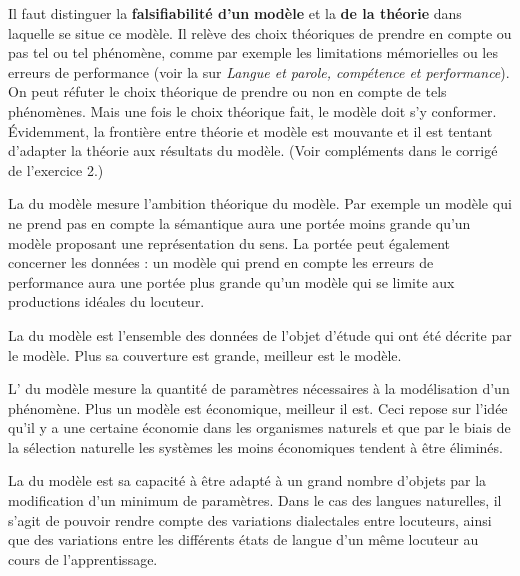 Il faut distinguer la \textbf{falsifiabilité d’un} \textbf{modèle} et la  \textbf{de la théorie} dans laquelle se situe ce modèle. Il relève des choix théoriques de prendre en compte ou pas tel ou tel phénomène, comme par exemple les limitations mémorielles ou les erreurs de performance (voir la  sur \textit{Langue et parole, compétence et performance}). On peut réfuter le choix théorique de prendre ou non en compte de tels phénomènes. Mais une fois le choix théorique fait, le modèle doit s’y conformer. Évidemment, la frontière entre théorie et modèle est mouvante et il est tentant d’adapter la théorie aux résultats du modèle. (Voir compléments dans le corrigé de l’exercice 2.)

La  du modèle mesure l’ambition théorique du modèle. Par exemple un modèle qui ne prend pas en compte la sémantique aura une portée moins grande qu’un modèle proposant une représentation du sens. La portée peut également concerner les données : un modèle qui prend en compte les erreurs de performance aura une portée plus grande qu’un modèle qui se limite aux productions idéales du locuteur.

La  du modèle est l’ensemble des données de l’objet d’étude qui ont été décrite par le modèle. Plus sa couverture est grande, meilleur est le modèle.

L’ du modèle mesure la quantité de paramètres nécessaires à la modélisation d’un phénomène. Plus un modèle est économique, meilleur il est. Ceci repose sur l’idée qu’il y a une certaine économie dans les organismes naturels et que par le biais de la sélection naturelle les systèmes les moins économiques tendent à être éliminés.

La  du modèle est sa capacité à être adapté à un grand nombre d’objets par la modification d’un minimum de paramètres. Dans le cas des langues naturelles, il s’agit de pouvoir rendre compte des variations dialectales entre locuteurs, ainsi que des variations entre les différents états de langue d’un même locuteur au cours de l’apprentissage.


